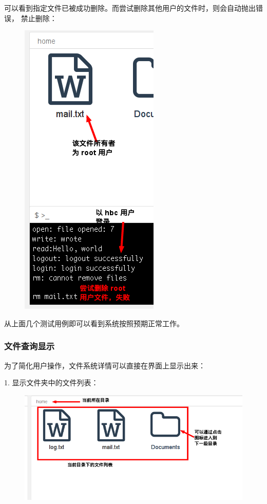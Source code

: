 \documentclass[12bp]{guo}
\begin{document}
\clearpage

可以看到指定文件已被成功删除。而尝试删除其他用户的文件时，则会自动抛出错误，
禁止删除：

\begin{figure}[h!]
    \centering
        \includegraphics[scale=0.75]{figures/fs-app.rm-failed.png}
\end{figure}

从上面几个测试用例即可以看到系统按照预期正常工作。

\clearpage

\subsubsection{文件查询显示}

为了简化用户操作，文件系统详情可以直接在界面上显示出来：

1. 显示文件夹中的文件列表：

\begin{figure}[h!]
    \centering
        \includegraphics[scale=0.75]{figures/fs-app.list.png}
\end{figure}
\end{document}
